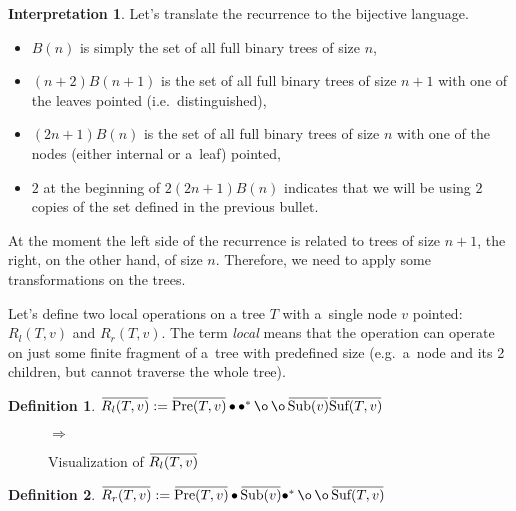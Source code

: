 \documentclass[final]{article}
\theoremstyle{definition}
\newtheorem{definition}{Definition}[subsection]
\theoremstyle{definition}
\newtheorem{interpretation}{Interpretation}[subsection]
\theoremstyle{remark}
\newcommand{\ols}[1]{\mskip.5\thinmuskip\overline{\mskip-.5\thinmuskip {#1} \mskip-.5\thinmuskip}\mskip.5\thinmuskip} %
\newcommand{\enc}[1]{\ensuremath{\ols{#1}}}
\newcommand{\pointed}[1]{\ensuremath{{#1}^*}}
\DeclareMathOperator{\tSub}{\text{Sub}}
\DeclareMathOperator{\tPre}{\text{Pre}}
\DeclareMathOperator{\tSuf}{\text{Suf}}
\DeclareMathOperator{\n}{\bullet}
\DeclareMathOperator{\no}{\o}
\begin{document}
\begin{interpretation}
Let's translate the recurrence to the bijective language.
\begin{itemize}
    \item \(B(n)\) is simply the set of all full binary trees of size \(n\),
    \item \((n + 2) B(n + 1)\) is the set of all full binary trees of size \(n + 1\) with one of the leaves pointed (i.e.~distinguished),
    \item \((2n + 1) B(n)\) is the set of all full binary trees of size \(n\) with one of the nodes (either internal or a~leaf) pointed,
    \item \(2\) at the beginning of \(2 (2n + 1) B(n)\) indicates that we will be using \(2\) copies of the set defined in the previous bullet.
\end{itemize}

At the moment the left side of the recurrence is related to trees of size \(n + 1\), the right, on the other hand, of size \(n\). Therefore, we need to apply some transformations on the trees.

Let's define two local operations on a tree \(T\) with a~single node \(v\) pointed: \(R_l(T, v)\) and \(R_r(T, v)\). The term \textit{local} means that the operation can operate on just some finite fragment of a~tree with predefined size (e.g.~a~node and its 2 children, but cannot traverse the whole tree).

\begin{definition}
    \(\enc{R_l(T, v)} := \enc{\tPre(T, v)} \n \pointed{\n} \no \no \enc{\tSub(v)} \enc{\tSuf(T, v)}\)
\end{definition}

\begin{figure}[H]
    \centering
    \begin{minipage}{.25\textwidth}\end{minipage}%
    \(\Rightarrow\)
    \begin{minipage}{.4\textwidth}\end{minipage}%
    \caption{Visualization of \(\enc{R_l(T, v)}\)}%
    \label{fig:remy_left}
\end{figure}

\begin{definition}
    \(\enc{R_r(T, v)} := \enc{\tPre(T, v)} \n \enc{\tSub(v)} \pointed{\n} \no \no \enc{\tSuf(T, v)} \)
\end{definition}


\end{interpretation}
\end{document}
